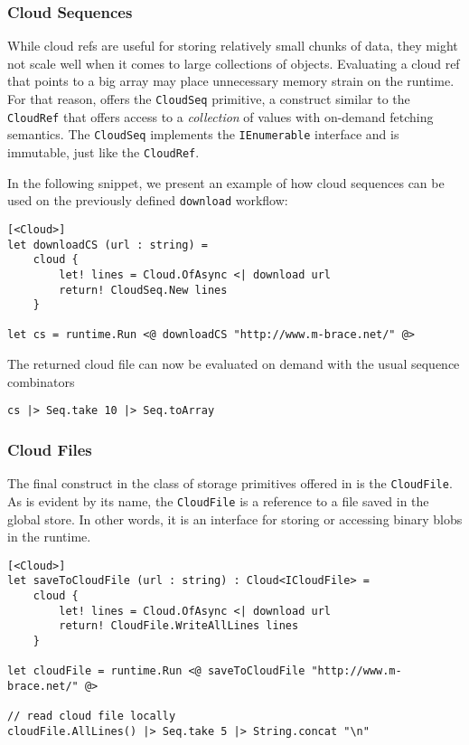 \subsubsection*{Cloud Sequences}

While cloud refs are useful for storing relatively small chunks of data,
they might not scale well when it comes to large collections of objects.
Evaluating a cloud ref that points to a big array may place
unnecessary memory strain on the runtime. For that reason,
\mbrace{} offers the \texttt{CloudSeq} primitive, 
a construct similar to the \texttt{CloudRef} that offers access to
a \emph{collection} of values with on-demand fetching semantics.
The \texttt{CloudSeq} implements the \dotnet{} \texttt{IEnumerable} interface 
and is immutable, just like the \texttt{CloudRef}.

In the following snippet, we present an example of how cloud sequences can be
used on the previously defined \texttt{download} workflow:
\begin{lstlisting}
[<Cloud>]
let downloadCS (url : string) =
    cloud {
        let! lines = Cloud.OfAsync <| download url
        return! CloudSeq.New lines
    }
    
let cs = runtime.Run <@ downloadCS "http://www.m-brace.net/" @>
\end{lstlisting}
The returned cloud file can now be evaluated on demand with the usual \fsharp{} 
sequence combinators
\begin{lstlisting}
cs |> Seq.take 10 |> Seq.toArray
\end{lstlisting}

\subsubsection*{Cloud Files}

The final construct in the class of storage primitives offered in \mbrace{}
is the \texttt{CloudFile}. As is evident by its name, the \texttt{CloudFile}
is a reference to a file saved in the global store. In other words, it is an
interface for storing or accessing binary blobs in the runtime.
\begin{lstlisting}
[<Cloud>]
let saveToCloudFile (url : string) : Cloud<ICloudFile> =
    cloud {
        let! lines = Cloud.OfAsync <| download url
        return! CloudFile.WriteAllLines lines
    }
    
let cloudFile = runtime.Run <@ saveToCloudFile "http://www.m-brace.net/" @>

// read cloud file locally
cloudFile.AllLines() |> Seq.take 5 |> String.concat "\n"
\end{lstlisting}

